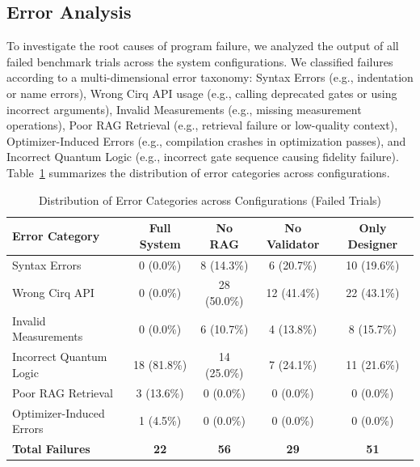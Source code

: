 \documentclass[runningheads]{llncs}
\begin{document}
\subsection{Error Analysis}
To investigate the root causes of program failure, we analyzed the output of all failed benchmark trials across the system configurations. We classified failures according to a multi-dimensional error taxonomy: Syntax Errors (e.g., indentation or name errors), Wrong Cirq API usage (e.g., calling deprecated gates or using incorrect arguments), Invalid Measurements (e.g., missing measurement operations), Poor RAG Retrieval (e.g., retrieval failure or low-quality context), Optimizer-Induced Errors (e.g., compilation crashes in optimization passes), and Incorrect Quantum Logic (e.g., incorrect gate sequence causing fidelity failure). Table~\ref{tab:error_analysis} summarizes the distribution of error categories across configurations.

\begin{table}[H]
\centering
\caption{Distribution of Error Categories across Configurations (Failed Trials)}
\label{tab:error_analysis}
\begin{tabular}{lcccc}
\toprule
\textbf{Error Category} & \textbf{Full System} & \textbf{No RAG} & \textbf{No Validator} & \textbf{Only Designer} \\
\midrule
Syntax Errors            & 0 (0.0\%)            & 8 (14.3\%)      & 6 (20.7\%)            & 10 (19.6\%)            \\
Wrong Cirq API           & 0 (0.0\%)            & 28 (50.0\%)     & 12 (41.4\%)           & 22 (43.1\%)            \\
Invalid Measurements     & 0 (0.0\%)            & 6 (10.7\%)      & 4 (13.8\%)            & 8 (15.7\%)             \\
Incorrect Quantum Logic  & 18 (81.8\%)          & 14 (25.0\%)     & 7 (24.1\%)            & 11 (21.6\%)            \\
Poor RAG Retrieval       & 3 (13.6\%)           & 0 (0.0\%)       & 0 (0.0\%)             & 0 (0.0\%)              \\
Optimizer-Induced Errors & 1 (4.5\%)            & 0 (0.0\%)       & 0 (0.0\%)             & 0 (0.0\%)              \\
\midrule
\textbf{Total Failures}  & \textbf{22}          & \textbf{56}     & \textbf{29}           & \textbf{51}            \\
\bottomrule
\end{tabular}
\end{table}
\end{document}
